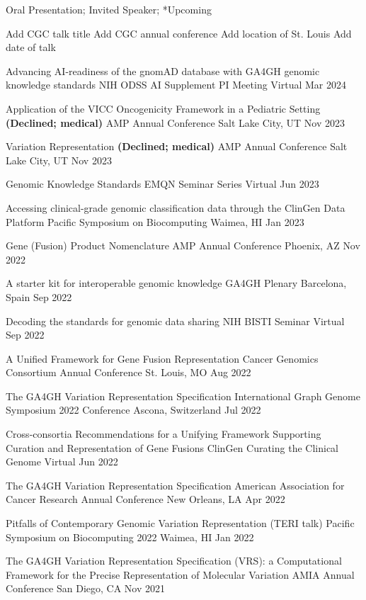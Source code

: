\textsuperscript{\textdagger}Oral Presentation; \textsuperscript{\textdaggerdbl}Invited Speaker; *Upcoming

\oral
{Add CGC talk title}
{Add CGC annual conference}
{Add location of St. Louis}
{Add date of talk}

\invited
{Advancing AI-readiness of the gnomAD database with GA4GH genomic knowledge standards}
{NIH ODSS AI Supplement PI Meeting}
{Virtual}
{Mar 2024}

\invited
{Application of the VICC Oncogenicity Framework in a Pediatric Setting \textbf{(Declined; medical)}}
{AMP Annual Conference}
{Salt Lake City, UT}
{Nov 2023}

\invited
{Variation Representation \textbf{(Declined; medical)}}
{AMP Annual Conference}
{Salt Lake City, UT}
{Nov 2023}

\invited
{Genomic Knowledge Standards}
{EMQN Seminar Series}
{Virtual}
{Jun 2023}

\oral
{Accessing clinical-grade genomic classification data through the ClinGen Data Platform}
{Pacific Symposium on Biocomputing}
{Waimea, HI}
{Jan 2023}

\invited
{Gene (Fusion) Product Nomenclature}
{AMP Annual Conference}
{Phoenix, AZ}
{Nov 2022}

\invited
{A starter kit for interoperable genomic knowledge}
{GA4GH Plenary}
{Barcelona, Spain}
{Sep 2022}

\invited
{Decoding the standards for genomic data sharing}
{NIH BISTI Seminar}
{Virtual}
{Sep 2022}

\oral
{A Unified Framework for Gene Fusion Representation}
{Cancer Genomics Consortium Annual Conference}
{St. Louis, MO}
{Aug 2022}

\invited
{The GA4GH Variation Representation Specification}
{International Graph Genome Symposium 2022 Conference}
{Ascona, Switzerland}
{Jul 2022}

\oral
{Cross-consortia Recommendations for a Unifying Framework Supporting Curation and Representation of Gene Fusions}
{ClinGen Curating the Clinical Genome}
{Virtual}
{Jun 2022}

\poster
{The GA4GH Variation Representation Specification}
{American Association for Cancer Research Annual Conference}
{New Orleans, LA}
{Apr 2022}

\invited
{Pitfalls of Contemporary Genomic Variation Representation (TERI talk)}
{Pacific Symposium on Biocomputing 2022}
{Waimea, HI}
{Jan 2022}

\oral
{The GA4GH Variation Representation Specification (VRS): a Computational Framework for the Precise Representation of Molecular Variation}
{AMIA Annual Conference}
{San Diego, CA}
{Nov 2021}

